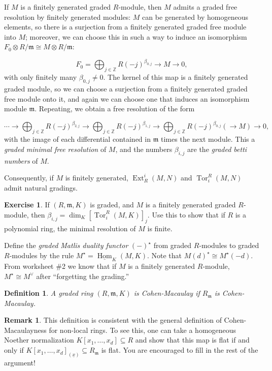 \documentclass[11pt]{book}
\newtheorem{definition}[theorem]{Definition}
\numberwithin{equation}{section}
\numberwithin{theorem}{chapter}
\theoremstyle{definition}
\newtheorem{exercise}[theorem]{Exercise}
\newtheorem*{basic properties}{Basic Properties}
\newtheorem*{Important Remark}{Important Remark}
\newtheorem{remark}[theorem]{Remark}
\theoremstyle{remark}
\newcommand{\ZZ}{\mathbb{Z}}
\newcommand{\m}{\mathfrak{m}}
\newcommand{\Ext}{\operatorname{Ext}}
\newcommand{\Tor}{\operatorname{Tor}}
\renewcommand{\dim}{\operatorname{dim}}
\newcommand{\grHom}{\underline{\operatorname{Hom}}}
\begin{document}
If $M$ is a finitely generated graded $R$-module, then $M$ admits a graded free resolution by finitely generated modules: $M$ can be generated by homogeneous elements, so there is a surjection from a finitely generated graded free module into $M$; moreover, we can choose this in such a way to induce an isomorphism $F_0\otimes R/\m \cong M \otimes R/\m$:

\[ F_0=\bigoplus_{j\in \ZZ} R(-{j})^{\beta_{0,j}} \longrightarrow M \longrightarrow 0, \]
with only finitely many $\beta_{0,j} \neq 0$. The kernel of this map is a finitely generated graded module, so we can choose a surjection from a finitely generated graded free module onto it, and again we can choose one that induces an isomorphism module $\m$. Repeating, we obtain a free resolution of the form

\[ \cdots \longrightarrow \bigoplus_{j\in \ZZ} R(-{j})^{\beta_{2,j}} \longrightarrow \bigoplus_{j\in \ZZ} R(-{j})^{\beta_{1,j}} \longrightarrow \bigoplus_{j\in \ZZ} R(-{j})^{\beta_{0,j}} (\longrightarrow M) \longrightarrow 0, \]
with the image of each differential contained in $\m$ times the next module. This a \emph{graded minimal free resolution} of $M$, and the numbers $\beta_{i,j}$ are the \emph{graded betti numbers} of $M$.

Consequently, if $M$ is finitely generated, $\Ext^i_R(M,N)$ and $\Tor^R_i(M,N)$ admit natural gradings.


\begin{exercise}
	If $(R,\m,K)$ is graded, and $M$ is a finitely generated graded $R$-module, then $\beta_{i,j}=\dim_K [\Tor^R_i(M,K)]_j$. Use this to show that if $R$ is a polynomial ring, the minimal resolution of $M$ is finite.
\end{exercise}

Define the \emph{graded Matlis duality functor}  $(-)^\star$ from graded $R$-modules to graded $R$-modules by the rule
$M^{\star}=\grHom_K(M,K)$. Note that $M(d)^\star\cong M^\star(-d)$. From worksheet \#2 we know that if $M$ is a finitely generated $R$-module, $M^{\star} \cong M^{\vee}$ after ``forgetting the grading.''

\begin{definition} A graded ring $(R,\m,K)$ is \emph{Cohen-Macaulay} if $R_\m$ is Cohen-Macaulay.
\end{definition}

\begin{remark} This definition is consistent with the general definition of Cohen-Macaulayness for non-local rings. To see this, one can take a homogeneous Noether normalization $K[x_1,\dots,x_d] \subseteq R$ and show that this map is flat if and only if $K[x_1,\dots,x_d]_{(\underline{x})} \subseteq R_\m$ is flat. You are encouraged to fill in the rest of the argument!
	\end{remark}
\end{document}
